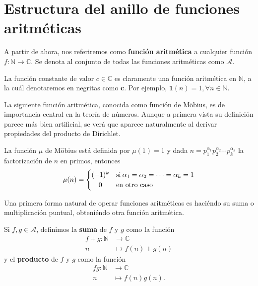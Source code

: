 \newpage
\section{Estructura del anillo de funciones aritméticas}

\begin{definition}
A partir de ahora, nos referiremos como \textbf{función aritmética} a cualquier función $f : \mathbb{N} \longrightarrow \mathbb{C}$. Se denota al conjunto de todas las funciones aritméticas como $\mathcal{A}$.
\end{definition}

\begin{definition}
La función constante de valor $c \in \mathbb{C}$ es claramente una función aritmética en $\mathbb{N}$, a la cuál denotaremos en negritas como $\mathbf{c}$. Por ejemplo, $\mathbf{1}(n)=1, \forall n \in \mathbb{N}$.
\end{definition}

La siguiente función aritmética, conocida como función de Möbius, es de importancia central en la teoría de números. Aunque a primera vista su definición parece más bien artificial, se verá que aparece naturalmente al derivar propiedades del producto de Dirichlet.

\begin{definition}
La función $\mu$ de Möbius está definida por $\mu(1)=1$ y dada $n=p_1^{\alpha_1}p_2^{\alpha_2}\cdots p_k^{\alpha_k}$ la factorización de $n$ en primos, entonces
\begin{equation*}
	\mu(n) =
		\begin{cases}
			(-1)^k & \text{si} \: \alpha_1=\alpha_2=\cdots=\alpha_k=1 \\ \hfil
			0 & \text{en otro caso} \: 
		\end{cases}
\end{equation*}
\end{definition}

Una primera forma natural de operar funciones aritméticas es haciéndo su suma o multiplicación puntual, obteniéndo otra función aritmética.

\begin{definition}
Si $f,g \in \mathcal{A}$, definimos la \textbf{suma} de $f$ y $g$ como la función \begin{align*}
    f+g : \mathbb{N} & \longrightarrow \mathbb{C} \\
    n & \longmapsto f(n)+g(n)
\end{align*}
y el \textbf{producto} de $f$ y $g$ como la función
\begin{align*}
    fg : \mathbb{N} & \longrightarrow \mathbb{C} \\
    n & \longmapsto f(n)g(n).
\end{align*}
\end{definition}

